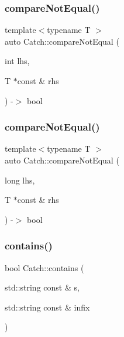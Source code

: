 \mbox{\label{namespaceCatch_adb4b3e912b89a987025ca28cf0c92ba8}} 
\subsubsection{\texorpdfstring{compare\+Not\+Equal()}{compareNotEqual()}\hspace{0.1cm}{\footnotesize\ttfamily [4/5]}}
{\footnotesize\ttfamily template$<$typename T $>$ \\
auto Catch\+::compare\+Not\+Equal (\begin{DoxyParamCaption}\item[{int}]{lhs,  }\item[{T $\ast$const \&}]{rhs }\end{DoxyParamCaption}) -\/$>$ bool }

\mbox{\label{namespaceCatch_a3db634a0adf44a1148767ba149ccf34d}} 
\subsubsection{\texorpdfstring{compare\+Not\+Equal()}{compareNotEqual()}\hspace{0.1cm}{\footnotesize\ttfamily [5/5]}}
{\footnotesize\ttfamily template$<$typename T $>$ \\
auto Catch\+::compare\+Not\+Equal (\begin{DoxyParamCaption}\item[{long}]{lhs,  }\item[{T $\ast$const \&}]{rhs }\end{DoxyParamCaption}) -\/$>$ bool }

\mbox{\label{namespaceCatch_aa52974b0e426e7e2fbd725a900e9c36e}} 
\subsubsection{\texorpdfstring{contains()}{contains()}}
{\footnotesize\ttfamily bool Catch\+::contains (\begin{DoxyParamCaption}\item[{std\+::string const \&}]{s,  }\item[{std\+::string const \&}]{infix }\end{DoxyParamCaption})}

